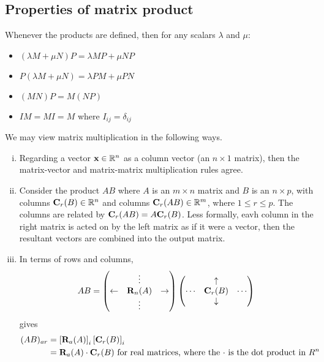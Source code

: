 \subsection{Properties of matrix product}
Whenever the products are defined, then for any scalars \(\lambda\) and \(\mu\):
\begin{itemize}
	\item \((\lambda M + \mu N)P = \lambda MP + \mu NP\)
	\item \(P(\lambda M + \mu N) = \lambda PM + \mu PN\)
	\item \((MN)P = M(NP)\)
	\item \(IM = MI = M\) where \(I_{ij} = \delta_{ij}\)
\end{itemize}
We may view matrix multiplication in the following ways.
\begin{enumerate}[(i)]
	\item Regarding a vector \(\vb x \in \mathbb R^n\) as a column vector (an \(n \times 1\) matrix), then the matrix-vector and matrix-matrix multiplication rules agree.
	\item Consider the product \(AB\) where \(A\) is an \(m \times n\) matrix and \(B\) is an \(n \times p\), with columns \(\vb C_r(B) \in \mathbb R^n\) and columns \(\vb C_r(AB) \in \mathbb R^m\), where \(1 \leq r \leq p\).
	      The columns are related by \(\vb C_r(AB) = A \vb C_r(B)\).
	      Less formally, eavh column in the right matrix is acted on by the left matrix as if it were a vector, then the resultant vectors are combined into the output matrix.
	\item In terms of rows and columns,
	      \[
		      AB = \begin{pmatrix}
			                 & \vdots     &             \\
			      \leftarrow & \vb R_n(A) & \rightarrow \\
			                 & \vdots     &
		      \end{pmatrix} \begin{pmatrix}
			             & \uparrow   &        \\
			      \cdots & \vb C_r(B) & \cdots \\
			             & \downarrow &
		      \end{pmatrix}
	      \]
	      gives
	      \begin{align*}
		      (AB)_{ar} & = \left[ \vb R_a(A) \right]_i \left[ \vb C_r(B) \right]_i                                                  \\
		                & = \vb R_a(A) \cdot \vb C_r(B) \text{ for real matrices, where the \(\cdot\) is the dot product in \(R^n\)}
	      \end{align*}
\end{enumerate}


